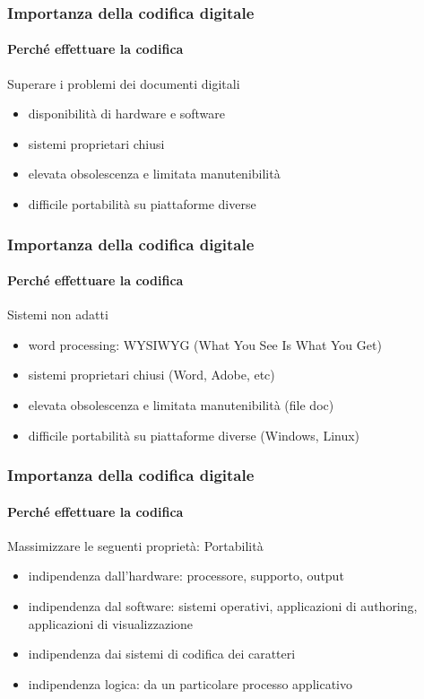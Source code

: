 \begin{frame}
	\frametitle{Importanza della codifica digitale}
	\framesubtitle{Perché effettuare la codifica}
	\addtocounter{nframe}{1}

	\begin{block}{Superare i problemi dei documenti digitali}
		\begin{itemize}
			\item disponibilità di hardware e software
			\item sistemi proprietari chiusi
			\item elevata obsolescenza e limitata manutenibilità
			\item difficile portabilità su piattaforme diverse
		\end{itemize}
	\end{block}

\end{frame}

\begin{frame}
	\frametitle{Importanza della codifica digitale}
	\framesubtitle{Perché effettuare la codifica}
	\addtocounter{nframe}{1}

	\begin{block}{Sistemi non adatti}
		\begin{itemize}
			\item word processing: WYSIWYG (What You See Is What You Get)
			\item sistemi proprietari chiusi (Word, Adobe, etc)
			\item elevata obsolescenza e limitata manutenibilità (file doc)
			\item difficile portabilità su piattaforme diverse (Windows, Linux)
		\end{itemize}
	\end{block}

\end{frame}

\begin{frame}
	\frametitle{Importanza della codifica digitale}
	\framesubtitle{Perché effettuare la codifica}
	\addtocounter{nframe}{1}

	\begin{block}{Massimizzare le seguenti proprietà: Portabilità}
		\begin{itemize}
			\item indipendenza dall’hardware: processore, supporto, output
			\item indipendenza dal software: sistemi operativi, applicazioni di authoring, applicazioni di visualizzazione
			\item indipendenza dai sistemi di codifica dei caratteri
			\item indipendenza logica: da un particolare processo applicativo
		\end{itemize}
	\end{block}

\end{frame}




